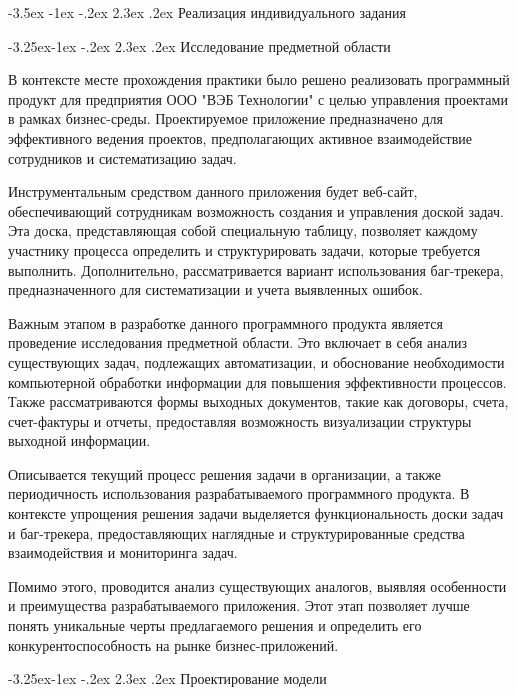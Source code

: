 \documentclass[a4paper,draft]{report}
\makeatletter
\renewcommand\section{\@startsection {section}{1}{\z@}%
  {-3.5ex \@plus -1ex \@minus -.2ex}%
  {2.3ex \@plus.2ex}%
  {\normalfont\newpage\indent\bfseries}}
\renewcommand\subsection{\@startsection{subsection}{2}{\z@}%
  {-3.25ex\@plus -1ex \@minus -.2ex}%
  {2.3ex \@plus .2ex}%
  {\normalfont\indent\bfseries}}
\makeatother
\begin{document}
\section{Реализация индивидуального задания}

\subsection{Исследование предметной области}

В контексте месте прохождения практики было решено реализовать программный продукт для предприятия ООО "ВЭБ Технологии" с целью управления проектами в рамках бизнес-среды.
Проектируемое приложение предназначено для эффективного ведения проектов, предполагающих активное взаимодействие сотрудников и систематизацию задач.

Инструментальным средством данного приложения будет веб-сайт, обеспечивающий сотрудникам возможность создания и управления доской задач.
Эта доска, представляющая собой специальную таблицу, позволяет каждому участнику процесса определить и структурировать задачи, которые требуется выполнить.
Дополнительно, рассматривается вариант использования баг-трекера, предназначенного для систематизации и учета выявленных ошибок.

Важным этапом в разработке данного программного продукта является проведение исследования предметной области.
Это включает в себя анализ существующих задач, подлежащих автоматизации, и обоснование необходимости компьютерной обработки информации для повышения эффективности процессов.
Также рассматриваются формы выходных документов, такие как договоры, счета, счет-фактуры и отчеты, предоставляя возможность визуализации структуры выходной информации.

Описывается текущий процесс решения задачи в организации, а также периодичность использования разрабатываемого программного продукта.
В контексте упрощения решения задачи выделяется функциональность доски задач и баг-трекера, предоставляющих наглядные и структурированные средства взаимодействия и мониторинга задач.

Помимо этого, проводится анализ существующих аналогов, выявляя особенности и преимущества разрабатываемого приложения.
Этот этап позволяет лучше понять уникальные черты предлагаемого решения и определить его конкурентоспособность на рынке бизнес-приложений.

\subsection{Проектирование модели}
\end{document}
